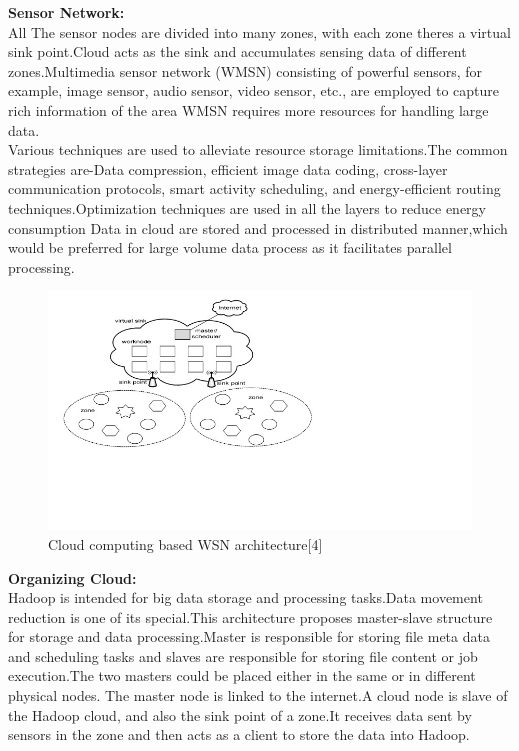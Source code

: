 \documentclass {report}
\begin{document}
{\bfseries Sensor Network:}\\
 All The sensor nodes are divided into many zones, with each zone theres a virtual sink point.Cloud acts as the sink and accumulates sensing data of different zones.Multimedia sensor network (WMSN) consisting of
 powerful sensors, for example, image sensor, audio sensor, video sensor, etc., are employed to capture rich information of the area
WMSN requires more resources for handling large data.\\
\indent Various techniques are used to alleviate resource storage limitations.The common strategies are-Data compression, efficient image data coding,
cross-layer communication protocols, smart activity scheduling, and energy-efficient routing techniques.Optimization techniques are used in all the layers to reduce energy consumption
Data in cloud are stored and processed in distributed manner,which would be preferred for large volume data process as it facilitates parallel processing.\\

\begin{figure}
\begin{center}
\includegraphics [scale=0.7]{Hadoop}
\caption{Cloud computing based WSN architecture[4]}
\end{center}
\end{figure}

{\bfseries Organizing Cloud:}\\
Hadoop is intended for big data storage and processing tasks.Data movement reduction is one of its special.This architecture proposes  master-slave structure for storage and data processing.Master is
responsible for storing file meta data and scheduling tasks and slaves are responsible for storing file content or job execution.The two masters could be placed either in the same or in different physical nodes.
The master node is linked to the internet.A cloud node is slave of the Hadoop cloud, and also the sink point of a zone.It receives data sent by sensors in the zone and then acts as a client to store the data into Hadoop. \\
\end{document}
